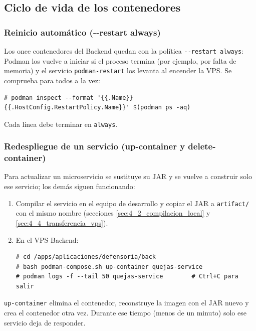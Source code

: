 \subsection{Ciclo de vida de los contenedores}\label{sec:6_4_ciclo_vida}

\subsubsection{Reinicio automático (-{}-restart always)}
Los once contenedores del Backend quedan con la política \texttt{-{}-restart always}: Podman los vuelve a iniciar si el proceso termina (por ejemplo, por falta de memoria) y el servicio \texttt{podman-restart} los levanta al encender la VPS. Se comprueba para todos a la vez:
\begin{lstlisting}
# podman inspect --format '{{.Name}} {{.HostConfig.RestartPolicy.Name}}' $(podman ps -aq)
\end{lstlisting}
Cada línea debe terminar en \texttt{always}.

\subsubsection{Redespliegue de un servicio (up-container y delete-container)}
Para actualizar un microservicio se sustituye su JAR y se vuelve a construir solo ese servicio; los demás siguen funcionando:
\begin{enumerate}
  \item Compilar el servicio en el equipo de desarrollo y copiar el JAR a \texttt{artifact/} con el mismo nombre (secciones \ref{sec:4_2_compilacion_local} y \ref{sec:4_4_transferencia_vps}).
  \item En el VPS Backend:
\begin{lstlisting}
# cd /apps/aplicaciones/defensoria/back
# bash podman-compose.sh up-container quejas-service
# podman logs -f --tail 50 quejas-service        # Ctrl+C para salir
\end{lstlisting}
\end{enumerate}
\texttt{up-container} elimina el contenedor, reconstruye la imagen con el JAR nuevo y crea el contenedor otra vez. Durante ese tiempo (menos de un minuto) solo ese servicio deja de responder.

